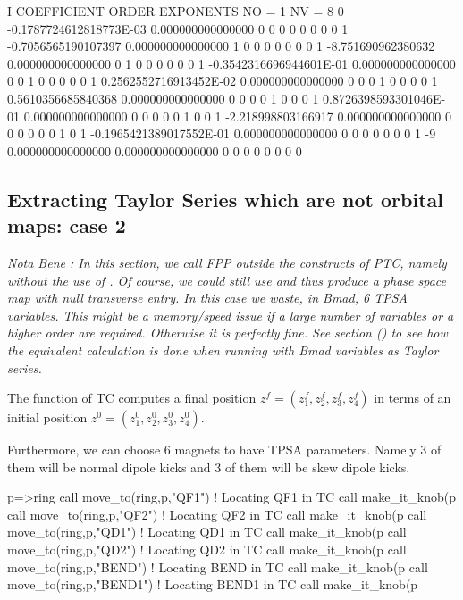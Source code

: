 \documentclass{hitec}     %
\begin{document}
{{{{{{\begin{code}
    I  COEFFICIENT          ORDER   EXPONENTS
      NO =     1      NV =     8
   0 -0.1787724612818773E-03   0.000000000000000       0  0  0  0  0  0  0  0
   1 -0.7056565190107397       0.000000000000000       1  0  0  0  0  0  0  0
   1  -8.751690962380632       0.000000000000000       0  1  0  0  0  0  0  0
   1 -0.3542316696944601E-01   0.000000000000000       0  0  1  0  0  0  0  0
   1  0.2562552716913452E-02   0.000000000000000       0  0  0  1  0  0  0  0
   1  0.5610356685840368       0.000000000000000       0  0  0  0  1  0  0  0
   1  0.8726398593301046E-01   0.000000000000000       0  0  0  0  0  1  0  0
   1  -2.218998803166917       0.000000000000000       0  0  0  0  0  0  1  0
   1 -0.1965421389017552E-01   0.000000000000000       0  0  0  0  0  0  0  1
    -9   0.000000000000000       0.000000000000000       0  0  0  0  0  0  0  0
\end{code}
\renewcommand{\codefont}{\small}



\subsection{Extracting Taylor Series which are not orbital maps: case 2}\label{s:exttay}

{\it Nota Bene :  In this section, we call FPP outside the constructs of PTC, namely without  the use of . Of course, we could still use  and thus produce a phase space map  with null transverse entry.
In this case we waste, in Bmad, 6 TPSA variables. This might be a memory/speed  issue if a large number of variables or a higher order are required. Otherwise it is perfectly fine.  See section () to see how the equivalent calculation is done when running with Bmad variables as Taylor series.}


The function  of TC computes a final position  $ z^f =(z_{1}^{f},z_{2}^{f},z_{3}^{f},z_{4}^{f})$ in terms of an initial  position
$ z^0 =(z_{1}^{0},z_{2}^{0},z_{3}^{0},z_{4}^{0})$. 

Furthermore, we can choose  6 magnets to have TPSA parameters. Namely 3 of them will be normal dipole kicks and 3 of them will be skew dipole kicks.

\begin{code}
p=>ring%
call move_to(ring,p,"QF1")   !  Locating QF1 in TC
call make_it_knob(p%
call move_to(ring,p,"QF2")  !  Locating QF2 in TC
call make_it_knob(p%
call move_to(ring,p,"QD1")     !  Locating QD1 in TC
call make_it_knob(p%
call move_to(ring,p,"QD2")     !  Locating QD2 in TC
call make_it_knob(p%
call move_to(ring,p,"BEND")     !  Locating BEND in TC
call make_it_knob(p%
call move_to(ring,p,"BEND1")    !  Locating BEND1 in TC
call make_it_knob(p%
\end{code}

}}}}}}
\end{document}
